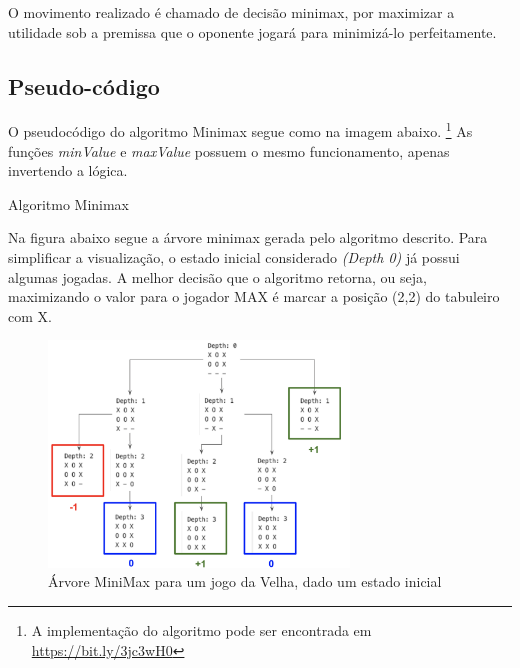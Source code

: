 \documentclass[sigplan,screen]{acmart}
\begin{document}
O movimento realizado é chamado de decisão minimax, por maximizar a utilidade sob a premissa que o oponente jogará para minimizá-lo perfeitamente.

\subsection{Pseudo-código}
O pseudocódigo do algoritmo Minimax segue como na imagem abaixo. 
\footnote{A implementação do algoritmo pode ser encontrada em \href{https://bit.ly/3jc3wH0}{https://bit.ly/3jc3wH0}}
As funções {\itshape minValue} e {\itshape maxValue} possuem o mesmo funcionamento, apenas invertendo a lógica.


\begin{algorithm}
\DontPrintSemicolon
  \caption{Algoritmo Minimax}
  \label{alg:generator}


\end{algorithm}

Na figura abaixo segue a árvore minimax gerada pelo algoritmo descrito. 
Para simplificar a visualização, o estado inicial considerado {\itshape(Depth 0)} já possui algumas jogadas.
A melhor decisão que o algoritmo retorna, ou seja, maximizando o valor para o jogador MAX é marcar a posição (2,2) do tabuleiro com X.

\begin{figure}[h]
  \includegraphics[width=8cm]{minimax_tree_1.png}
  \caption{Árvore MiniMax para um jogo da Velha, dado um estado inicial}
\end{figure}
\end{document}

